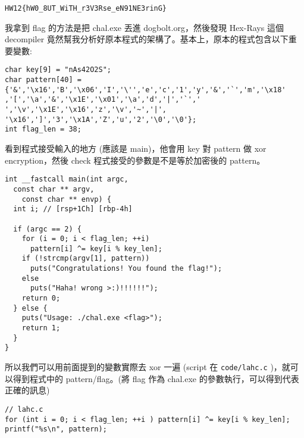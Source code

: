 \documentclass[12pt]{article}
\begin{document}
{\centering\verb|HW12{hW0_8UT_WiTH_r3V3Rse_eN91NE3rinG}|\par}

我拿到 flag 的方法是把 chal.exe 丟進 dogbolt.org，然後發現 Hex-Rays 這個 decompiler 竟然幫我分析好原本程式的架構了。基本上，原本的程式包含以下重要變數:
\begin{verbatim}
char key[9] = "nAs42O2S";
char pattern[40] = {'&','\x16','B','\x06','I','\'','e','c','1','y','&','`','m','\x18'
,'[','\a','&','\x1E','\x01','\a','d','|','`',' ','\v','\x1E','\x16','z','\v','~','|',
'\x16',']','3','\x1A','Z','u','2','\0','\0'}; 
int flag_len = 38; 
\end{verbatim}

看到程式接受輸入的地方 (應該是 main)，他會用 key 對 pattern 做 xor encryption，然後 check 程式接受的參數是不是等於加密後的 pattern。
\begin{verbatim}
int __fastcall main(int argc,
  const char ** argv,
    const char ** envp) {
  int i; // [rsp+1Ch] [rbp-4h]

  if (argc == 2) {
    for (i = 0; i < flag_len; ++i)
      pattern[i] ^= key[i % key_len];
    if (!strcmp(argv[1], pattern))
      puts("Congratulations! You found the flag!");
    else
      puts("Haha! wrong >:)!!!!!!");
    return 0;
  } else {
    puts("Usage: ./chal.exe <flag>");
    return 1;
  }
}
\end{verbatim}

所以我們可以用前面提到的變數實際去 xor 一遍 (script 在 \verb|code/lahc.c| )，就可以得到程式中的 pattern/flag。(將 flag 作為 chal.exe 的參數執行，可以得到代表正確的訊息)
\begin{verbatim}
// lahc.c
for (int i = 0; i < flag_len; ++i ) pattern[i] ^= key[i % key_len];
printf("%s\n", pattern);
\end{verbatim}
\end{document}
